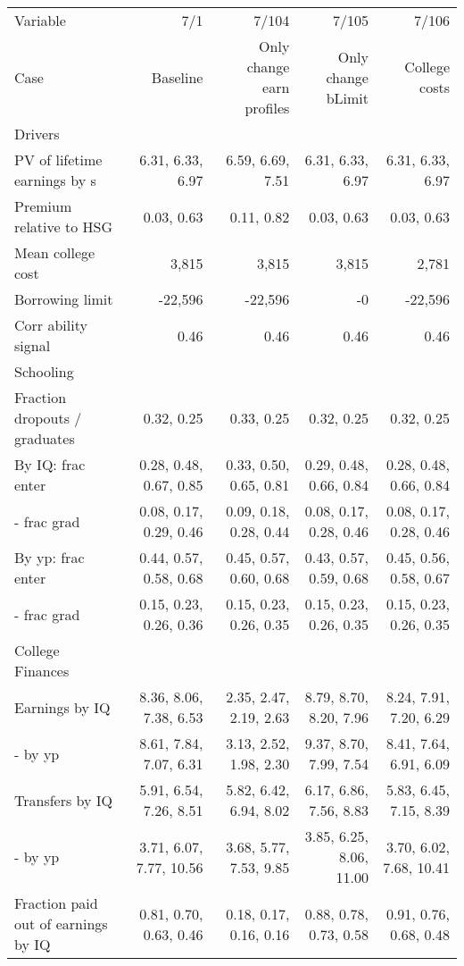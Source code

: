 \begin{tabular}{lrrrr}
\hline
Variable & 7/1  & 7/104  & 7/105  & 7/106  \\
Case & Baseline  & Only change earn profiles  & Only change bLimit  & College costs  \\
Drivers &   &   &   &   \\
PV of lifetime earnings by s & 6.31, 6.33, 6.97  & 6.59, 6.69, 7.51  & 6.31, 6.33, 6.97  & 6.31, 6.33, 6.97  \\
Premium relative to HSG & 0.03, 0.63  & 0.11, 0.82  & 0.03, 0.63  & 0.03, 0.63  \\
Mean college cost & 3,815  & 3,815  & 3,815  & 2,781  \\
Borrowing limit & -22,596  & -22,596  & -0  & -22,596  \\
Corr ability signal & 0.46  & 0.46  & 0.46  & 0.46  \\
\hline
Schooling &   &   &   &   \\
Fraction dropouts / graduates & 0.32, 0.25  & 0.33, 0.25  & 0.32, 0.25  & 0.32, 0.25  \\
By IQ: frac enter & 0.28, 0.48, 0.67, 0.85  & 0.33, 0.50, 0.65, 0.81  & 0.29, 0.48, 0.66, 0.84  & 0.28, 0.48, 0.66, 0.84  \\
- frac grad & 0.08, 0.17, 0.29, 0.46  & 0.09, 0.18, 0.28, 0.44  & 0.08, 0.17, 0.28, 0.46  & 0.08, 0.17, 0.28, 0.46  \\
By yp: frac enter & 0.44, 0.57, 0.58, 0.68  & 0.45, 0.57, 0.60, 0.68  & 0.43, 0.57, 0.59, 0.68  & 0.45, 0.56, 0.58, 0.67  \\
- frac grad & 0.15, 0.23, 0.26, 0.36  & 0.15, 0.23, 0.26, 0.35  & 0.15, 0.23, 0.26, 0.35  & 0.15, 0.23, 0.26, 0.35  \\
\hline
College Finances &   &   &   &   \\
Earnings by IQ & 8.36, 8.06, 7.38, 6.53  & 2.35, 2.47, 2.19, 2.63  & 8.79, 8.70, 8.20, 7.96  & 8.24, 7.91, 7.20, 6.29  \\
- by yp & 8.61, 7.84, 7.07, 6.31  & 3.13, 2.52, 1.98, 2.30  & 9.37, 8.70, 7.99, 7.54  & 8.41, 7.64, 6.91, 6.09  \\
Transfers by IQ & 5.91, 6.54, 7.26, 8.51  & 5.82, 6.42, 6.94, 8.02  & 6.17, 6.86, 7.56, 8.83  & 5.83, 6.45, 7.15, 8.39  \\
- by yp & 3.71, 6.07, 7.77, 10.56  & 3.68, 5.77, 7.53, 9.85  & 3.85, 6.25, 8.06, 11.00  & 3.70, 6.02, 7.68, 10.41  \\
Fraction paid out of earnings by IQ & 0.81, 0.70, 0.63, 0.46  & 0.18, 0.17, 0.16, 0.16  & 0.88, 0.78, 0.73, 0.58  & 0.91, 0.76, 0.68, 0.48  \\

\end{tabular}

